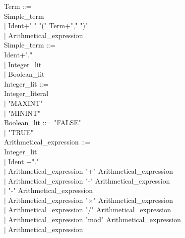 \documentclass[12pt,a4paper,draft]{article}
\begin{document}
{\begin{sloppypar}
   
\noindent Term  ::= \\
   Simple\_term\\
\hspace*{0.20in} $|$ Ident+"." "(" Term+"," ")"  \\
\hspace*{0.20in} $|$  Arithmetical\_expression\\
Simple\_term ::= \\
  Ident+"."\\
\hspace*{0.20in} $|$  Integer\_lit\\
\hspace*{0.20in} $|$  Boolean\_lit\\
Integer\_lit ::= \\
  Integer\_literal \\
\hspace*{0.20in} $|$ "MAXINT"\\
\hspace*{0.20in} $|$ "MININT" \\
Boolean\_lit ::= "FALSE"\\
\hspace*{0.20in} $|$ "TRUE" \\
Arithmetical\_expression ::= \\
\hspace*{0.20in}   Integer\_lit\\
\hspace*{0.20in} $|$  Ident +"."\\
\hspace*{0.20in} $|$  Arithmetical\_expression  "+"  Arithmetical\_expression\\
\hspace*{0.20in} $|$  Arithmetical\_expression  "-"  Arithmetical\_expression\\
\hspace*{0.20in} $|$ "-" Arithmetical\_expression \\
\hspace*{0.20in} $|$  Arithmetical\_expression  "$\times$"  Arithmetical\_expression\\
\hspace*{0.20in} $|$  Arithmetical\_expression  "/"  Arithmetical\_expression\\
\hspace*{0.20in} $|$  Arithmetical\_expression  "mod"  Arithmetical\_expression\\
\hspace*{0.20in} $|$  Arithmetical\_expression  \\

\end{sloppypar}}
\end{document}
